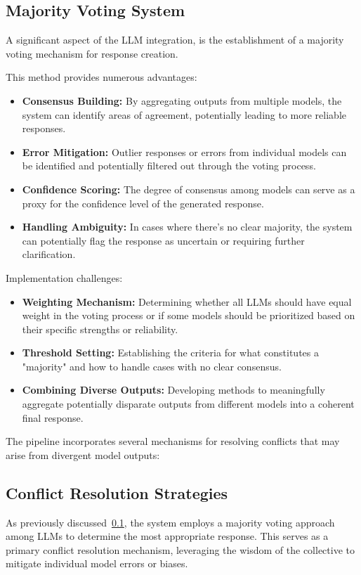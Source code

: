 \subsection{Majority Voting System}\label{subsec:majority-voting-system}
A significant aspect of the LLM integration, is the establishment of a majority voting mechanism for response creation.

This method provides numerous advantages:
\begin{itemize}
    \item \textbf{Consensus Building:} By aggregating outputs from multiple models, the system can identify areas of agreement, potentially leading to more reliable responses.
    \item \textbf{Error Mitigation:} Outlier responses or errors from individual models can be identified and potentially filtered out through the voting process.
    \item \textbf{Confidence Scoring:} The degree of consensus among models can serve as a proxy for the confidence level of the generated response.
    \item \textbf{Handling Ambiguity:} In cases where there's no clear majority, the system can potentially flag the response as uncertain or requiring further clarification.
\end{itemize}

Implementation challenges:
\begin{itemize}
    \item \textbf{Weighting Mechanism:} Determining whether all LLMs should have equal weight in the voting process or if some models should be prioritized based on their specific strengths or reliability.
    \item \textbf{Threshold Setting:} Establishing the criteria for what constitutes a "majority" and how to handle cases with no clear consensus.
    \item \textbf{Combining Diverse Outputs:} Developing methods to meaningfully aggregate potentially disparate outputs from different models into a coherent final response.
\end{itemize}
The pipeline incorporates several mechanisms for resolving conflicts that may arise from divergent model outputs:

\subsection{Conflict Resolution Strategies}\label{subsec:conflict-resolution-strategies}
As previously discussed~\ref{subsec:majority-voting-system}, the system employs a majority voting approach among LLMs to determine the most appropriate response.
This serves as a primary conflict resolution mechanism, leveraging the wisdom of the collective to mitigate individual model errors or biases.
